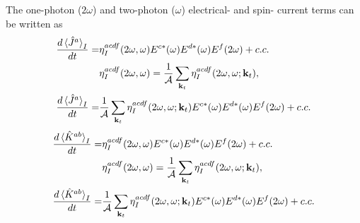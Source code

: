 \documentclass{article}
\newcommand{\kt}{\mathbf{k}_{t}}
\begin{document}
The one-photon ($2\omega$) and two-photon ($\omega$)  electrical- and spin-
current terms can be written as
\begin{align}
\frac{d\ev*{\hat{J}^{a}}_{I}}{dt} = & \eta^{acdf}_{I}(2\omega,\omega) 
E^{c*}(\omega) E^{d*}(\omega) E^{f}(2\omega) + c.c. \nonumber \\
& \eta^{acdf}_{I}(2\omega,\omega) = \frac{1}{\mathcal{A}} \sum_{\kt} 
\eta^{acdf}_{I}(2\omega,\omega;\kt) , \nonumber \\
\frac{d\ev*{\hat{J}^{a}}_{I}}{dt} = & \frac{1}{\mathcal{A}} \sum_{\kt} 
\eta^{acdf}_{I}(2\omega,\omega;\kt) E^{c*}(\omega)
E^{d*}(\omega) E^{f}(2\omega) + c.c. \label{eq:J_12-I}
\end{align}
\begin{align}
\frac{d\ev*{\hat{K}^{ab}}_{I}}{dt} = & \eta^{acdf}_{I}(2\omega,\omega) 
E^{c*}(\omega) E^{d*}(\omega) E^{f}(2\omega) + c.c. \nonumber \\
& \eta^{acdf}_{I}(2\omega,\omega) = \frac{1}{\mathcal{A}} \sum_{\kt} 
\eta^{acdf}_{I}(2\omega,\omega;\kt) , \nonumber \\
\frac{d\ev*{\hat{K}^{ab}}_{I}}{dt} = & \frac{1}{\mathcal{A}} \sum_{\kt} 
\eta^{acdf}_{I}(2\omega,\omega;\kt) E^{c*}(\omega)
E^{d*}(\omega) E^{f}(2\omega) + c.c. \label{eq:K_12-I}
\end{align}
\end{document}

